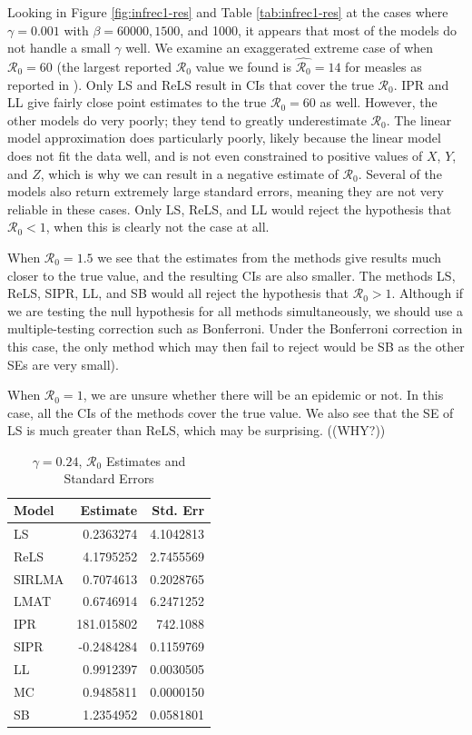 \documentclass[12pt]{article}
\newcommand{\rr}{\ensuremath{\mathcal{R}_0}}
\begin{document}
Looking in Figure \ref{fig:infrec1-res} and Table \ref{tab:infrec1-res} at the cases where $\gamma = 0.001$ with $\beta=60000, 1500$, and 1000, it appears that most of the models do not handle a small $\gamma$ well.  We examine an exaggerated extreme case of when $\rr=60$ (the largest reported $\rr$ value we found is $\hat{\rr}=14$ for measles as reported in \cite{anderson1992}). Only LS and ReLS result in CIs that cover the true $\rr$. IPR and LL give fairly close point estimates to the true $\rr=60$ as well. However, the other models do very poorly; they tend to greatly underestimate $\rr$. The linear model approximation does particularly poorly, likely because the linear model does not fit the data well, and is not even constrained to positive values of $X$, $Y$, and $Z$, which is why we can result in a negative estimate of $\rr$. Several of the models also return extremely large standard errors, meaning they are not very reliable in these cases.  Only LS, ReLS, and LL would reject the hypothesis that $\rr <1$, when this is clearly not the case at all.

When $\rr=1.5$ we see that the estimates from the methods give results much closer to the true value, and the resulting CIs are also smaller.  The methods LS, ReLS, SIPR, LL, and SB would all reject the hypothesis that $\rr > 1$.  Although if we are testing the null hypothesis for  all methods simultaneously, we should use a multiple-testing correction such as Bonferroni.  Under the Bonferroni correction in this case, the only method which may then fail to reject would be SB as the other SEs are very small).

When $\rr=1$, we are unsure whether there will be an epidemic or not.  In this case, all the CIs of the methods cover the true value.  We also see that the SE of LS is much greater than ReLS, which may be surprising. ((WHY?))

\begin{table}[H]

	\centering
	\begin{tabular}[t]{l|r|r}
		\hline
		Model & Estimate & Std. Err\\
		\hline
		LS & 0.2363274 & 4.1042813\\
		\hline
		ReLS & 4.1795252 & 2.7455569\\
		\hline
		SIRLMA &  0.7074613 & 0.2028765 \\
		\hline
		LMAT & 0.6746914 & 6.2471252 \\
		\hline
		IPR & 181.015802 & 742.1088 \\
		\hline
		SIPR & -0.2484284 & 0.1159769 \\
		\hline
		LL & 0.9912397 & 0.0030505\\
		\hline
		MC & 0.9485811 & 0.0000150\\
		\hline
		SB & 1.2354952 & 0.0581801\\
		\hline
	\end{tabular}
        \caption{$\gamma = 0.24$, $\rr$ Estimates and Standard Errors}\label{tab:infrec4-res}
\end{table}
\end{document}
